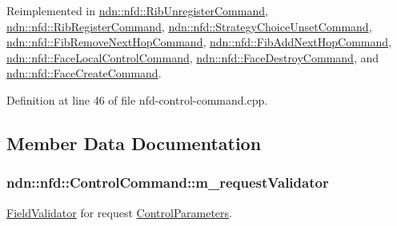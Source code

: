 Reimplemented in \hyperlink{classndn_1_1nfd_1_1RibUnregisterCommand_af709649c210d15654a34ef01b436cccb}{ndn\+::nfd\+::\+Rib\+Unregister\+Command}, \hyperlink{classndn_1_1nfd_1_1RibRegisterCommand_a2f0b8f3e6d3e76e24b7e3a92d1e5436c}{ndn\+::nfd\+::\+Rib\+Register\+Command}, \hyperlink{classndn_1_1nfd_1_1StrategyChoiceUnsetCommand_aa8258b5552a202d02b3e997506d4de25}{ndn\+::nfd\+::\+Strategy\+Choice\+Unset\+Command}, \hyperlink{classndn_1_1nfd_1_1FibRemoveNextHopCommand_ab86cd9bd9eb9903c7c76f5f8e636b55a}{ndn\+::nfd\+::\+Fib\+Remove\+Next\+Hop\+Command}, \hyperlink{classndn_1_1nfd_1_1FibAddNextHopCommand_abc246a14883158916698fba84edaf222}{ndn\+::nfd\+::\+Fib\+Add\+Next\+Hop\+Command}, \hyperlink{classndn_1_1nfd_1_1FaceLocalControlCommand_a29f7eaef6c002089a83e46880577518c}{ndn\+::nfd\+::\+Face\+Local\+Control\+Command}, \hyperlink{classndn_1_1nfd_1_1FaceDestroyCommand_a4c1b0b12dce8d11f355231a0ba983e85}{ndn\+::nfd\+::\+Face\+Destroy\+Command}, and \hyperlink{classndn_1_1nfd_1_1FaceCreateCommand_a4863aa04cc67d85d285eb40a38633ef4}{ndn\+::nfd\+::\+Face\+Create\+Command}.



Definition at line 46 of file nfd-\/control-\/command.\+cpp.



\subsection{Member Data Documentation}
\subsubsection[{\texorpdfstring{m\+\_\+request\+Validator}{m\_requestValidator}}]{ ndn\+::nfd\+::\+Control\+Command\+::m\+\_\+request\+Validator\hspace{0.3cm}{\ttfamily [protected]}}\hypertarget{classndn_1_1nfd_1_1ControlCommand_af936f10c7dbe8edd1af548290d74efb0}{}\label{classndn_1_1nfd_1_1ControlCommand_af936f10c7dbe8edd1af548290d74efb0}


\hyperlink{classndn_1_1nfd_1_1ControlCommand_1_1FieldValidator}{Field\+Validator} for request \hyperlink{classndn_1_1nfd_1_1ControlParameters}{Control\+Parameters}. 

